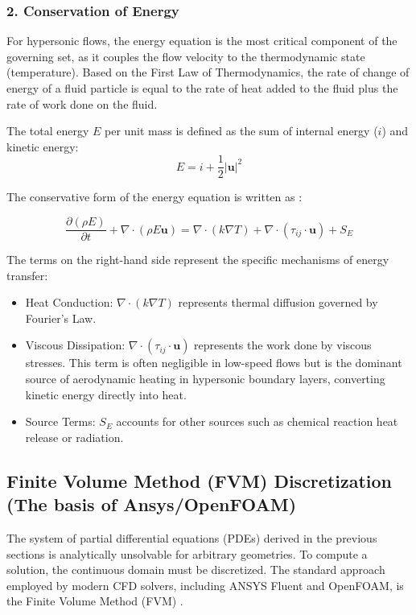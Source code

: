 \subsubsection*{2. Conservation of Energy}
For hypersonic flows, the energy equation is the most critical component of the governing set, as it couples the flow velocity to the thermodynamic state (temperature). Based on the First Law of Thermodynamics, the rate of change of energy of a fluid particle is equal to the rate of heat added to the fluid plus the rate of work done on the fluid.

The total energy $E$ per unit mass is defined as the sum of internal energy ($i$) and kinetic energy:
\begin{equation}
    E = i + \frac{1}{2} |\mathbf{u}|^2
\end{equation}

The conservative form of the energy equation is written as \cite{versteeg2007cfd}:

\begin{equation}
    \frac{\partial (\rho E)}{\partial t} + \nabla \cdot (\rho E \mathbf{u}) = \nabla \cdot (k \nabla T) + \nabla \cdot (\tau_{ij} \cdot \mathbf{u}) + S_E
\end{equation}

The terms on the right-hand side represent the specific mechanisms of energy transfer:
\begin{itemize}
    \item Heat Conduction: $\nabla \cdot (k \nabla T)$ represents thermal diffusion governed by Fourier's Law.
    \item Viscous Dissipation: $\nabla \cdot (\tau_{ij} \cdot \mathbf{u})$ represents the work done by viscous stresses. This term is often negligible in low-speed flows but is the dominant source of aerodynamic heating in hypersonic boundary layers, converting kinetic energy directly into heat.
    \item Source Terms: $S_E$ accounts for other sources such as chemical reaction heat release or radiation.
\end{itemize}


\subsection{Finite Volume Method (FVM) Discretization (The basis of Ansys/OpenFOAM)}

The system of partial differential equations (PDEs) derived in the previous sections is analytically unsolvable for arbitrary geometries. To compute a solution, the continuous domain must be discretized. The standard approach employed by modern CFD solvers, including ANSYS Fluent and OpenFOAM, is the Finite Volume Method (FVM) \cite{versteeg2007cfd}.

